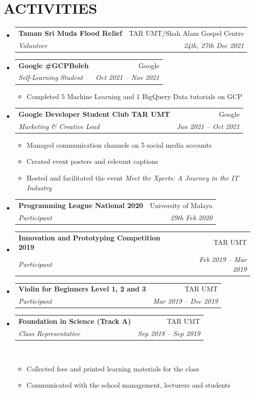 \documentclass[a4paper,11pt]{article}
\makeatletter
\newcommand{\resumeItem}[2]{
  \item\small{
    {#1}{#2 \vspace{-2pt}}
  }
}
\newcommand{\resumeSubheading}[4]{
  \vspace{-1pt}\item
    \begin{tabular*}{0.97\textwidth}[t]{l@{\extracolsep{\fill}}r}
      \textbf{\color{MyBlue} #1} & {\footnotesize#2} \\
      \textit{\footnotesize #3} & \textit{\footnotesize #4} \\
    \end{tabular*}\vspace{-5pt}
}
\newcommand{\resumeSubHeadingListStart}{\begin{itemize}[leftmargin=*]}
\newcommand{\resumeSubHeadingListEnd}{\end{itemize}}
\newcommand{\resumeItemListStart}{\begin{itemize}}
\newcommand{\resumeItemListEnd}{\end{itemize}\vspace{-5pt}}
\makeatother
\begin{document}
\section{ACTIVITIES}

\resumeSubHeadingListStart
\resumeSubheading{Taman Sri Muda Flood Relief}{TAR UMT/Shah Alam Gospel Centre}{Volunteer}{24th, 27th Dec 2021}
\resumeSubheading{Google \#GCPBoleh}{Google}{Self-Learning Student}{Oct 2021 -- Nov 2021}
\resumeItemListStart
\resumeItem{}{Completed 5 Machine Learning and 1 BigQuery Data tutorials on GCP}
\resumeItemListEnd
\resumeSubheading{Google Developer Student Club TAR UMT}{Google}
{Marketing \& Creative Lead}{Jan 2021 -- Oct 2021}
\resumeItemListStart
\resumeItem{}{Managed communication channels on 5 social media accounts}
\resumeItem{}{Created event posters and relevant captions}
\resumeItem{}{Hosted and facilitated the event \textit{Meet the Xperts: A Journey in the IT Industry}}
\resumeItemListEnd

\resumeSubheading{Programming League National 2020}{University of Malaya}
{Participant}{29th Feb 2020}

\resumeSubheading{Innovation and Prototyping Competition 2019}{TAR UMT}{Participant}{Feb 2019 -- Mar 2019}

\resumeSubheading{Violin for Beginners Level 1, 2 and 3}{TAR UMT}{Participant}{Mar 2019 -- Dec 2019}

\resumeSubheading{Foundation in Science (Track A)}{TAR UMT}{Class Representative}{Sep 2018 -- Sep 2019}\
\resumeItemListStart
\resumeItem{}{Collected fees and printed learning materials for the class}
\resumeItem{}{Communicated with the school management, lecturers and students}
\resumeItemListEnd
\resumeSubHeadingListEnd


\end{document}
